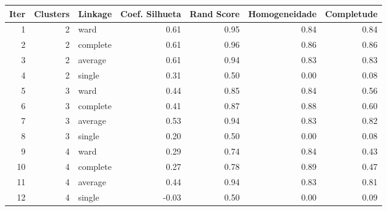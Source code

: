 \begin{tabular}{rrlrrrr}
\toprule
Iter & Clusters & Linkage & Coef. Silhueta & Rand Score & Homogeneidade & Completude \\
\midrule
1 & 2 & ward & 0.61 & 0.95 & 0.84 & 0.84 \\
2 & 2 & complete & 0.61 & 0.96 & 0.86 & 0.86 \\
3 & 2 & average & 0.61 & 0.94 & 0.83 & 0.83 \\
4 & 2 & single & 0.31 & 0.50 & 0.00 & 0.08 \\
5 & 3 & ward & 0.44 & 0.85 & 0.84 & 0.56 \\
6 & 3 & complete & 0.41 & 0.87 & 0.88 & 0.60 \\
7 & 3 & average & 0.53 & 0.94 & 0.83 & 0.82 \\
8 & 3 & single & 0.20 & 0.50 & 0.00 & 0.08 \\
9 & 4 & ward & 0.29 & 0.74 & 0.84 & 0.43 \\
10 & 4 & complete & 0.27 & 0.78 & 0.89 & 0.47 \\
11 & 4 & average & 0.44 & 0.94 & 0.83 & 0.81 \\
12 & 4 & single & -0.03 & 0.50 & 0.00 & 0.09 \\
\bottomrule
\end{tabular}
